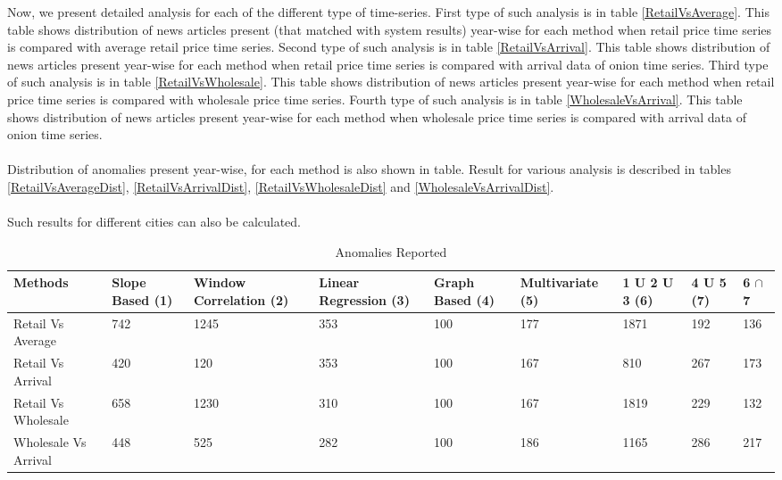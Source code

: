 \documentclass[a4paper,10pt]{report}
\begin{document}
Now, we present detailed analysis for each of the different type of time-series. First type of such analysis is in table \ref{RetailVsAverage}. This table shows distribution of news articles present (that matched with system results) year-wise for each method when retail price time series is compared with average retail price time series. Second type of such analysis is in table \ref{RetailVsArrival}. This table shows distribution of news articles present year-wise for each method when retail price time series is compared with arrival data of onion time series. Third type of such analysis is in table \ref{RetailVsWholesale}. This table shows distribution of news articles present year-wise for each method when retail price time series is compared with wholesale price time series. Fourth type of such analysis is in table \ref{WholesaleVsArrival}. This table shows distribution of news articles present year-wise for each method when wholesale price time series is compared with arrival data of onion time series.\\
\\
Distribution of anomalies present year-wise, for each method is also shown in table. Result for various analysis is described in tables  \ref{RetailVsAverageDist}, \ref{RetailVsArrivalDist}, \ref{RetailVsWholesaleDist} and \ref{WholesaleVsArrivalDist}.\\
\\
Such results for different cities can also be calculated.




	\begin{table}[]
	\centering
	
	\resizebox{\textwidth}{!}
	{\begin{tabular}{|l|l|l|l|l|l|l|l|l|}
	\hline
	Methods		    & Slope Based (1) & Window Correlation (2) & Linear Regression (3) & Graph Based (4) & Multivariate (5) & 1 U 2 U 3 (6) & 4 U 5 (7) & 6  $\cap$ 7 \\
	\hline
	Retail Vs Average    & 742             & 1245                   & 353                   & 100             & 177              & 1871          & 192       & 136       \\
	\hline
	Retail Vs Arrival    & 420             & 120                    & 353                   & 100             & 167              & 810           & 267       & 173       \\
	\hline
	Retail Vs Wholesale  & 658             & 1230                   & 310                   & 100             & 167              & 1819          & 229       & 132       \\
	\hline
	Wholesale Vs Arrival & 448             & 525                    & 282                   & 100             & 186              & 1165          & 286       & 217       \\
	\hline
	\end{tabular}}
	\caption{Anomalies Reported}
	\label{AnomaliesReported}
	\end{table}
    
\end{document}
